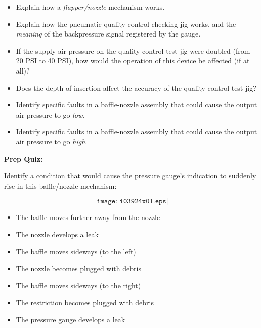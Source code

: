 \begin{itemize}
\item{} Explain how a {\it flapper/nozzle} mechanism works.
\item{} Explain how the pneumatic quality-control checking jig works, and the {\it meaning} of the backpressure signal registered by the gauge.
\item{} If the supply air pressure on the quality-control test jig were doubled (from 20 PSI to 40 PSI), how would the operation of this device be affected (if at all)?
\item{} Does the depth of insertion affect the accuracy of the quality-control test jig?
\item{} Identify specific faults in a baffle-nozzle assembly that could cause the output air pressure to go {\it low}.
\item{} Identify specific faults in a baffle-nozzle assembly that could cause the output air pressure to go {\it high}.
\end{itemize}






















\vfil \eject

\noindent
{\bf Prep Quiz:}

Identify a condition that would cause the pressure gauge's indication to suddenly rise in this baffle/nozzle mechanism:

$$\texttt{[image: i03924x01.eps]}$$


\begin{itemize}
\item{} The baffle moves further away from the nozzle
\vskip 5pt 
\item{} The nozzle develops a leak
\vskip 5pt 
\item{} The baffle moves sideways (to the left) 
\vskip 5pt 
\item{} The nozzle becomes plugged with debris
\vskip 5pt 
\item{} The baffle moves sideways (to the right)
\vskip 5pt 
\item{} The restriction becomes plugged with debris
\vskip 5pt 
\item{} The pressure gauge develops a leak
\end{itemize}



